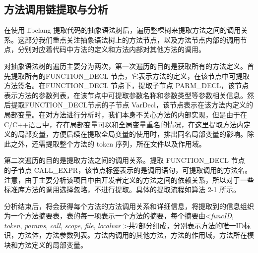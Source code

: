 \subsection{方法调用链提取与分析}
在使用 libclang 提取代码的抽象语法树后，遍历整棵树来提取方法之间的调用关系。这部分我们重点关注抽象语法树上的方法节点，以及方法节点内部的调用节点，分别对应着代码中方法的定义和方法内部对其他方法的调用。


对抽象语法树的遍历主要分为两次，第一次遍历的目的是获取所有的方法定义。首先提取所有的FUNCTION\_DECL 节点，它表示方法的定义，在该节点中可提取方法签名。在FUNCTION\_DECL 节点下，提取子节点 PARM\_DECL，该节点表示方法的参数列表，在该节点中可提取参数名称和参数类型等参数相关信息。然后提取FUNCTION\_DECL节点的子节点 VarDecl，该节点表示在该方法内定义的局部变量。在对方法进行分析时，我们本身不关心方法的内部实现，但是由于在 C/C++语言中，存在局部变量可以和全局变量重名的情况，在这里提取方法内定义的局部变量，方便后续在提取全局变量的使用时，排出同名局部变量的影响。除此之外，还需提取整个方法的 token 序列，所在文件以及作用域。


第二次遍历的目的是提取方法之间的调用关系。提取 FUNCTION\_DECL 节点
的子节点 CALL\_EXPR，该节点标签表示的是调用语句，可提取调用的方法名。注意，由于主要分析该项目中由开发者定义的方法之间的依赖关系，所以对于一些标准库方法的调用选择忽略，不进行提取。具体的提取流程如算法 2-1 所示。

分析结束后，将会获得每个方法的方法调用关系和详细信息，将提取到的信息组织为一个方法摘要表，表的每一项表示一个方法的摘要，每个摘要由\textless \textit{funcID}, \textit{token}, \textit{params}, \textit{call}, \textit{scope}, \textit{file}, \textit{localvar} \textgreater 共7部分组成，分别表示方法的唯一ID标识，方法体，方法参数列表。方法内调用的其他方法，方法的作用域，方法所在模块和方法定义的局部变量。


